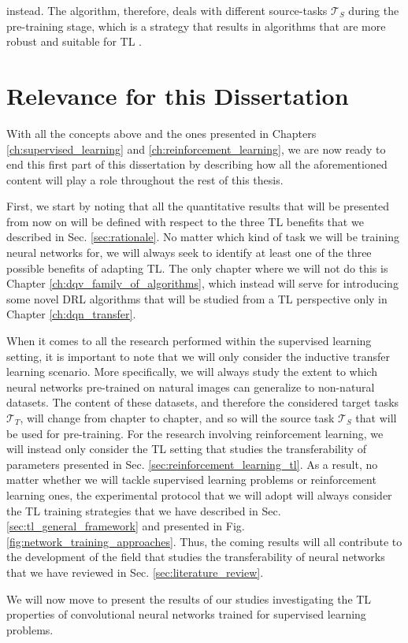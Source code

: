 instead. The algorithm, therefore, deals with different source-tasks $\mathcal{T}_S$ during the pre-training stage, which is a strategy that results in algorithms that are more robust and suitable for TL \cite{kirkpatrick2017overcoming}.  


\section{Relevance for this Dissertation}
\label{sec:relevance}

With all the concepts above and the ones presented in Chapters \ref{ch:supervised_learning} and \ref{ch:reinforcement_learning}, we are now ready to end this first part of this dissertation by describing how all the aforementioned content will play a role throughout the rest of this thesis. 

First, we start by noting that all the quantitative results that will be presented from now on will be defined with respect to the three TL benefits that we described in Sec. \ref{sec:rationale}. No matter which kind of task we will be training neural networks for, we will always seek to identify at least one of the three possible benefits of adapting TL. The only chapter where we will not do this is Chapter \ref{ch:dqv_family_of_algorithms}, which instead will serve for introducing some novel DRL algorithms that will be studied from a TL perspective only in Chapter \ref{ch:dqn_transfer}.

When it comes to all the research performed within the supervised learning setting, it is important to note that we will only consider the inductive transfer learning scenario. More specifically, we will always study the extent to which neural networks pre-trained on natural images can generalize to non-natural datasets. The content of these datasets, and therefore the considered target tasks $\mathcal{T}_T$, will change from chapter to chapter, and so will the source task $\mathcal{T}_S$ that will be used for pre-training. For the research involving reinforcement learning, we will instead only consider the TL setting that studies the transferability of parameters presented in Sec. \ref{sec:reinforcement_learning_tl}. As a result, no matter whether we will tackle supervised learning problems or reinforcement learning ones, the experimental protocol that we will adopt will always consider the TL training strategies that we have described in Sec. \ref{sec:tl_general_framework} and presented in Fig. \ref{fig:network_training_approaches}. Thus, the coming results will all contribute to the development of the field that studies the transferability of neural networks that we have reviewed in Sec. \ref{sec:literature_review}.

We will now move to present the results of our studies investigating the TL properties of convolutional neural networks trained for supervised learning problems.

